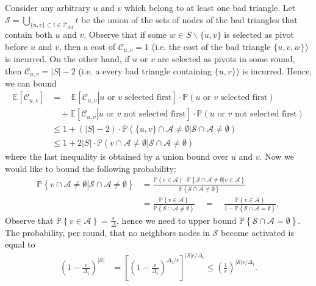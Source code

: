 \documentclass{article} %
\renewcommand{\Pr}{\mathbb{P}}
\begin{document}
Consider any arbitrary $u$ and $v$ which belong to at least one bad triangle.
Let $\mathcal{S} = \bigcup_{\{u,v\}\subset t \in \mathcal{T}_\text{old}} t$ be the union of the sets of nodes of the bad triangles that contain both $u$ and $v$.
Observe that if some $w \in S \backslash \{u,v\}$ is selected as pivot before $u$ and $v$, then a cost of $\mathcal{C}_{u,v} = 1$ (i.e. the cost of the bad triangle $\{u,v,w\}$) is incurred.
On the other hand, if $u$ or $v$ are selected as pivots in some round, then $\mathcal{C}_{u,v} = |S|-2$ (i.e. a every bad triangle containing $\{u,v\}$) is incurred.
Hence, we can bound
\begin{align*}
\mathbb{E}\left[\mathcal{C}_{u,v}\right]
&=\quad \mathbb{E}\left[\left.\mathcal{C}_{u,v} \right| \text{$u$ or $v$     selected first}\right] \cdot \Pr(\text{$u$ or $v$     selected first})\\
&\quad+ \mathbb{E}\left[\left.\mathcal{C}_{u,v} \right| \text{$u$ or $v$ not selected first}\right] \cdot \Pr(\text{$u$ or $v$ not selected first})\\
&\leq 1 + (|S|-2) \cdot \Pr(\{u,v\} \cap \mathcal{A} \neq \emptyset | \mathcal{S} \cap \mathcal{A} \neq \emptyset)\\
&\leq 1 + 2|S| \cdot \Pr(v\cap \mathcal{A} \neq \emptyset | \mathcal{S} \cap \mathcal{A} \neq \emptyset)
\end{align*}
where the last inequality is obtained by a union bound over $u$ and $v$.
Now we would like to bound the following probability:
\begin{align*}
\Pr\left\{
\left.v \cap \mathcal{A} \neq\emptyset\right|  \mathcal{S}\cap\mathcal{A} \neq\emptyset
\right\} 
&= \frac{\Pr\left\{v\in\mathcal{A}\right\}\cdot \Pr\left\{\mathcal{S}\cap\mathcal{A} \neq\emptyset \left|v\in\mathcal{A} \right.\right\}}{\Pr\left\{\mathcal{S}\cap\mathcal{A} \neq\emptyset \right\}}\\
&= \frac{\Pr\left\{v\in\mathcal{A}\right\}}{\Pr\left\{\mathcal{S}\cap\mathcal{A} \neq\emptyset \right\}}
\quad=\quad\frac{\Pr\left\{v\in\mathcal{A}\right\}}{1-\Pr\left\{\mathcal{S}\cap\mathcal{A} =\emptyset\right\}},
\end{align*}
Observe that 
$\Pr\left\{v\in\mathcal{A}\right\} = \frac{\epsilon}{\Delta}$, hence we need to upper bound $\Pr\left\{\mathcal{S}\cap\mathcal{A} =\emptyset\right\}$.
The probability, per round, that no neighbors nodes in $\mathcal{S}$ become activated is equal to
\begin{align*}
\left(1- \frac{\epsilon}{\Delta_i}\right)^{|\mathcal{S}|}
&
= \left[\left(1- \frac{\epsilon}{\Delta_i}\right)^{\Delta_i/\epsilon}\right]^{|\mathcal{S}|\epsilon/\Delta_i}
\le \left(\frac{1}{e}\right)^{|\mathcal{S}|\epsilon/\Delta_i}.
\end{align*}
\end{document}
